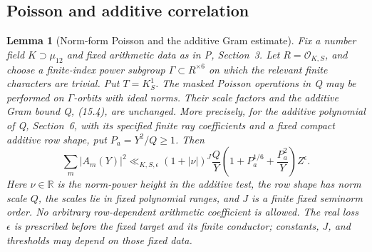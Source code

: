 \documentclass[11pt,a4paper]{article}
\newtheorem{lemma}[theorem]{Lemma}
\theoremstyle{remark}\newtheorem{remark}[theorem]{Remark}
\numberwithin{equation}{section}
\begin{document}
\subsection{Poisson and additive correlation}
\begin{lemma}[Norm-form Poisson and the additive Gram estimate]\label{lem-orbit-gram}
Fix a number field $K\supset\mu_{12}$ and fixed arithmetic data as in
P, Section~3. Let $R=\mathcal O_{K,S}$, and choose a finite-index power
subgroup $\Gamma\subset R^{\times6}$ on which the relevant finite
characters are trivial. Put $T=K_S^1$. The masked Poisson operations
in Q may be performed on $\Gamma$-orbits with ideal norms. Their
scale factors and the additive Gram bound Q, (15.4), are unchanged.
More precisely, for the additive polynomial of Q, Section~6, with its
specified finite ray coefficients and a fixed compact additive row
shape, put $P_a=Y^2/Q\ge1$. Then
\[
 \sum_m |A_m(Y)|^2
 \ll_{K,S,\epsilon}(1+|\nu|)^J\frac QY
       \left(1+P_a^{1/6}+\frac{P_a^2}{Y}\right)Z^\epsilon.
\]
Here $\nu\in\mathbb R$ is the norm-power height in the additive test,
the row shape has norm scale $Q$, the scales lie in fixed
polynomial ranges, and $J$ is a finite fixed seminorm order.
No arbitrary row-dependent arithmetic coefficient is allowed.
The real loss $\epsilon$ is prescribed before the fixed target and
its finite conductor; constants, $J$, and thresholds may depend on
those fixed data.
\end{lemma}
\end{document}
